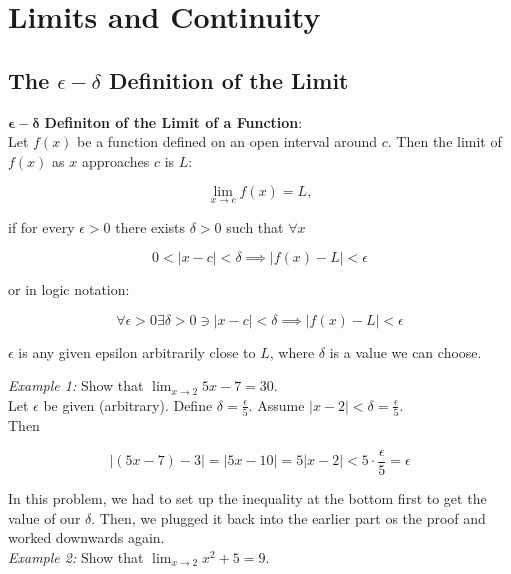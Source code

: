 \section{Limits and Continuity}
    \subsection{The $\epsilon-\delta$ Definition of the Limit}
        \begin{tcolorbox}[colback=red!10]
            $\bm{\epsilon-\delta}$ \textbf{Definiton of the Limit of a Function}: \\
            Let $f(x)$ be a function defined on an open interval around $c$. Then the limit of $f(x)$ as $x$ approaches $c$ is $L$:

            \[
                \lim_{x\to c} f(x) = L,
            \]

            if for every $\epsilon > 0$ there exists $\delta > 0$ such that $\forall x$

            \[
                0 < |x-c| < \delta \implies |f(x)-L| < \epsilon
            \]

            or in logic notation:

            \[
                \forall \epsilon >0 \exists \delta > 0 \ni |x-c| < \delta \implies |f(x) - L | < \epsilon
            \]

            $\epsilon$ is any given epsilon arbitrarily close to $L$, where $\delta$ is a value we can choose.
        \end{tcolorbox}

        \color{blue} \textit{Example 1:} Show that $\lim_{x\to 2}5x-7=30.$ \color{black} \\

        Let $\epsilon$ be given (arbitrary). Define $\delta = \frac{\epsilon}{5}$. Assume $|x-2| < \delta = \frac{\epsilon}{5}$. \\

        Then

        \[
            |(5x-7)-3| = |5x-10| = 5|x-2| < 5 \cdot \frac{\epsilon}{5} = \epsilon
        \]

        In this problem, we had to set up the inequality at the bottom first to get the value of our $\delta$. Then, we plugged it back into the earlier part os the proof and worked downwards again. \\

        \color{blue} \textit{Example 2: }Show that $\lim_{x\to 2}x^2+5 = 9$. \color{black} \\

